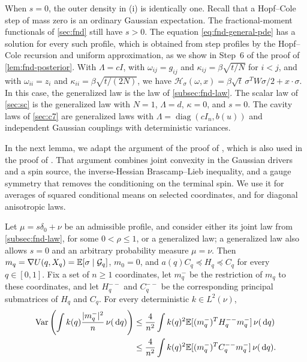 When $s=0$, the outer density in (i) is identically one. Recall that a
Hopf--Cole step of mass zero is an
ordinary Gaussian expectation. The
fractional-moment functionals of \cref{sec:fnd} still have $s>0$. The
equation \eqref{eq:fnd-general-pde} has a solution for every such
profile, which is obtained from step profiles by the Hopf--Cole recursion and
uniform approximation, as we show in Step~6 of the proof of
\cref{lem:fnd-posterior}. With $\Lambda=cI$, with $\omega_{ij}=g_{ij}$
and $\kappa_{ij}=\beta\sqrt{t/N}$ for $i<j$, and with $\omega_{ii}=z_i$
and $\kappa_{ii}=\beta\sqrt{t/(2N)}$, we have
$\mathcal H_\sigma(\omega,x)=\beta\sqrt t\,\sigma^TW\sigma/2+x\cdot\sigma$.
In this case, the generalized law is the law of \cref{subsec:fnd-law}. The scalar
law of \cref{sec:sc} is the generalized law with $N=1$, $\Lambda=d$,
$\kappa=0$, and $s=0$. The cavity laws of \cref{sec:c7} are generalized
laws with $\Lambda=\operatorname{diag}(cI_n,b(u))$ and
independent Gaussian couplings with deterministic variances.

In the next lemma, we adapt the argument of the proof of
\cite[Lemma~2.3]{OpenAIFluctuationScale}, which is also used in the proof
of \cite[Lemma~2.1]{OpenAILimitingLaw}. That argument combines joint
convexity in the Gaussian drivers and a spin source, the inverse-Hessian
Brascamp--Lieb inequality, and a gauge symmetry that removes the
conditioning on the terminal spin. We use
it for averages of squared conditional means on selected coordinates, and
for diagonal anisotropic laws.

\begin{lemma}
\label{lem:fnd-posterior}
Let $\mu=s\delta_0+\nu$ be an admissible profile, and consider either
its joint law from \cref{subsec:fnd-law}, for some $0<\rho\le1$, or a
generalized law; a generalized law also allows $s=0$ and an arbitrary
probability measure $\mu=\nu$. Then
$m_q=\nabla U(q,X_q)=\mathbb E[\sigma\mid\mathcal G_q]$, $m_0=0$, and
$a(q)C_q\preceq H_q\preceq C_q$ for every $q\in[0,1]$. Fix a set of
$n\ge1$ coordinates, let $m_q^-$ be the restriction of $m_q$ to these
coordinates, and let $H_q^{--}$ and $C_q^{--}$ be the corresponding
principal submatrices of $H_q$ and $C_q$. For every deterministic
$k\in L^2(\nu)$,
\begin{equation}\label{eq:fnd-posterior}
 \begin{aligned}
 \operatorname{Var}\left(\int k(q)\frac{|m_q^-|^2}{n}\,\nu(\,\mathrm d q)\right)
 &\le\frac4{n^2}\int k(q)^2
       \mathbb E[(m_q^-)^TH_q^{--}m_q^-]\,\nu(\,\mathrm d q)\\
 &\le\frac4{n^2}\int k(q)^2
       \mathbb E[(m_q^-)^TC_q^{--}m_q^-]\,\nu(\,\mathrm d q).
 \end{aligned}
\end{equation}
\end{lemma}

